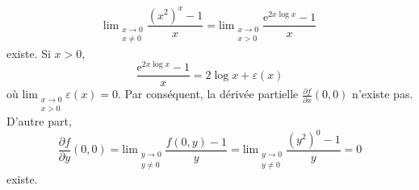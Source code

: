 {\begin{enumerate}
{\[\mathrm{lim}_{\begin{smallmatrix} x \to 0\\ x \ne 0
\end{smallmatrix}}\frac {(x^2)^x-1}x = 
\mathrm{lim}_{\begin{smallmatrix} x \to 0\\ x > 0
\end{smallmatrix}}\frac {\mathrm e^{2x \log x} -1}x
\]
existe. Si $x>0$,
\[
\frac {\mathrm e^{2x \log x} -1}x = 2 \log x + \varepsilon(x)
\]
o\`u $\mathrm{lim}_{\begin{smallmatrix} x \to 0\\ x > 0
\end{smallmatrix}}\varepsilon(x)=0$. Par cons\'equent,
 la d\'eriv\'ee partielle
$\frac{\partial f}{\partial x}(0,0)$ n'existe pas.
D'autre part,
\[
\frac{\partial f}{\partial y}(0,0)=
\mathrm{lim}_{\begin{smallmatrix} y \to 0\\ y \ne 0
\end{smallmatrix}}\frac {f(0,y) -1}y =
\mathrm{lim}_{\begin{smallmatrix} y \to 0\\ y \ne 0
\end{smallmatrix}}\frac {(y^2)^0-1}y = 0
\]
existe.}
\end{enumerate}
}